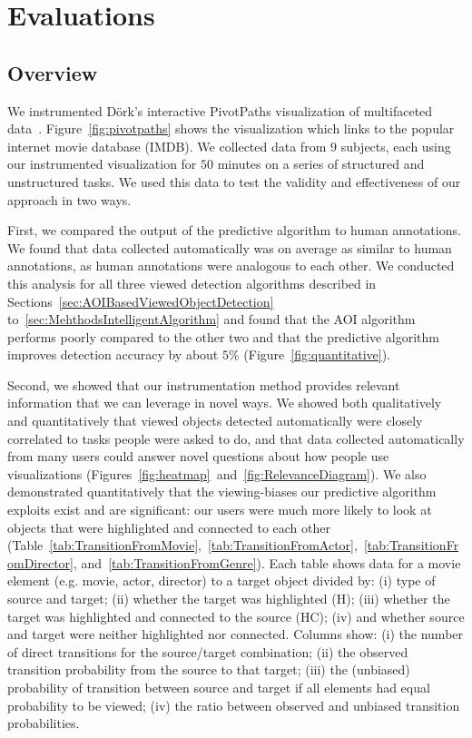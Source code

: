 \section{Evaluations}
\label{sec:DOICollectionEvaluation}

\subsection{Overview}
We instrumented D{\"o}rk's interactive PivotPaths visualization of multifaceted data~\cite{Dor12}. Figure~\ref{fig:pivotpaths} shows the visualization which links to the popular internet movie database (IMDB). We collected data from $9$ subjects, each using our instrumented visualization for $50$ minutes on a series of structured and unstructured tasks. We used this data to test the validity and effectiveness of our approach in two ways. 

First, we compared the output of the predictive algorithm to human annotations. We found that data collected automatically was on average as similar to human annotations, as human annotations were analogous to each other. We conducted this analysis for all three viewed detection algorithms described in Sections~\ref{sec:AOIBasedViewedObjectDetection} to~\ref{sec:MehthodsIntelligentAlgorithm} and found that the AOI algorithm performs poorly compared to the other two and that the predictive algorithm improves detection accuracy by about $5\%$  (Figure~\ref{fig:quantitative}). 

Second, we showed that our instrumentation method provides relevant information that we can leverage in novel ways. We showed both qualitatively and quantitatively that viewed objects detected automatically were closely correlated to tasks people were asked to do, and that data collected automatically from many users could answer novel questions about how people use visualizations (Figures~\ref{fig:heatmap}~and~\ref{fig:RelevanceDiagram}). We also demonstrated quantitatively that the viewing-biases our predictive algorithm exploits exist and are significant: our users were much more likely to look at objects that were highlighted and connected to each other (Table~\ref{tab:TransitionFromMovie},~\ref{tab:TransitionFromActor},~\ref{tab:TransitionFromDirector}, and~\ref{tab:TransitionFromGenre}).  Each table shows data for a movie element (e.g. movie, actor, director) to a target object divided by: (i) type of source and target; (ii) whether the target was highlighted (H); (iii) whether the target was highlighted and connected to the source (HC); (iv) and whether source and target were neither highlighted nor connected. Columns show: (i) the number of direct transitions for the source/target combination; (ii) the observed transition probability from the source to that target; (iii) the (unbiased) probability of transition between source and target if all elements had equal probability to be viewed; (iv) the ratio between observed and unbiased transition probabilities.



